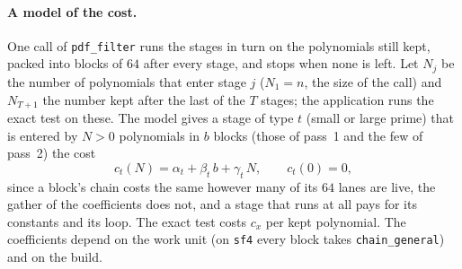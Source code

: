 \documentclass[10pt,a4paper]{article}
\newcommand{\code}[1]{\texttt{#1}}
\theoremstyle{plain}
\theoremstyle{definition}
\begin{document}
\paragraph{A model of the cost.}  One call of \code{pdf\_filter} runs the stages in turn on the polynomials still kept, packed into blocks of $64$ after every
stage, and stops when none is left.  Let $N_j$ be the number of polynomials that enter stage $j$ ($N_1=n$, the size of the call) and $N_{T+1}$ the number kept
after the last of the $T$ stages; the application runs the exact test on these.  The model gives a stage of type $t$ (small or large prime) that is entered by $N>0$
polynomials in $b$ blocks (those of pass~1 and the few of pass~2) the cost
\[
c_t(N)=\alpha_t+\beta_t\,b+\gamma_t\,N,\qquad c_t(0)=0,
\]
since a block's chain costs the same however many of its $64$ lanes are live, the gather of the coefficients does not, and a stage that runs at all pays for its
constants and its loop.  The exact test costs $c_x$ per kept polynomial.  The coefficients depend on the work unit (on \code{sf4} every block takes
\code{chain\_general}) and on the build.
\end{document}
